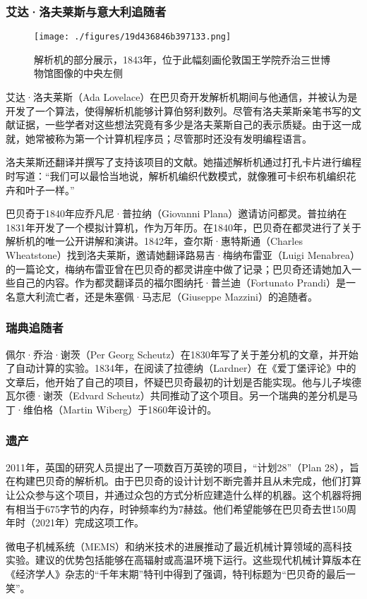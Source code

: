 \subsubsection{艾达·洛夫莱斯与意大利追随者}
\begin{figure}[ht]
\centering
\texttt{[image: ./figures/19d436846b397133.png]}
\caption{解析机的部分展示，1843年，位于此幅刻画伦敦国王学院乔治三世博物馆图像的中央左侧} \label{fig_CRSBQ_14}
\end{figure}
艾达·洛夫莱斯（Ada Lovelace）在巴贝奇开发解析机期间与他通信，并被认为是开发了一个算法，使得解析机能够计算伯努利数列。尽管有洛夫莱斯亲笔书写的文献证据，一些学者对这些想法究竟有多少是洛夫莱斯自己的表示质疑。由于这一成就，她常被称为第一个计算机程序员；尽管那时还没有发明编程语言。

洛夫莱斯还翻译并撰写了支持该项目的文献。她描述解析机通过打孔卡片进行编程时写道：“我们可以最恰当地说，解析机编织代数模式，就像雅可卡织布机编织花卉和叶子一样。”

巴贝奇于1840年应乔凡尼·普拉纳（Giovanni Plana）邀请访问都灵。普拉纳在1831年开发了一个模拟计算机，作为万年历。在1840年，巴贝奇在都灵进行了关于解析机的唯一公开讲解和演讲。1842年，查尔斯·惠特斯通（Charles Wheatstone）找到洛夫莱斯，邀请她翻译路易吉·梅纳布雷亚（Luigi Menabrea）的一篇论文，梅纳布雷亚曾在巴贝奇的都灵讲座中做了记录；巴贝奇还请她加入一些自己的内容。作为都灵翻译员的福尔图纳托·普兰迪（Fortunato Prandi）是一名意大利流亡者，还是朱塞佩·马志尼（Giuseppe Mazzini）的追随者。
\subsubsection{瑞典追随者} 
佩尔·乔治·谢茨（Per Georg Scheutz）在1830年写了关于差分机的文章，并开始了自动计算的实验。1834年，在阅读了拉德纳（Lardner）在《爱丁堡评论》中的文章后，他开始了自己的项目，怀疑巴贝奇最初的计划是否能实现。他与儿子埃德瓦尔德·谢茨（Edvard Scheutz）共同推动了这个项目。另一个瑞典的差分机是马丁·维伯格（Martin Wiberg）于1860年设计的。
\subsubsection{遗产} 
2011年，英国的研究人员提出了一项数百万英镑的项目，“计划28”（Plan 28），旨在构建巴贝奇的解析机。由于巴贝奇的设计计划不断完善并且从未完成，他们打算让公众参与这个项目，并通过众包的方式分析应建造什么样的机器。这个机器将拥有相当于675字节的内存，时钟频率约为7赫兹。他们希望能够在巴贝奇去世150周年时（2021年）完成这项工作。

微电子机械系统（MEMS）和纳米技术的进展推动了最近机械计算领域的高科技实验。建议的优势包括能够在高辐射或高温环境下运行。这些现代机械计算版本在《经济学人》杂志的“千年末期”特刊中得到了强调，特刊标题为“巴贝奇的最后一笑”。

